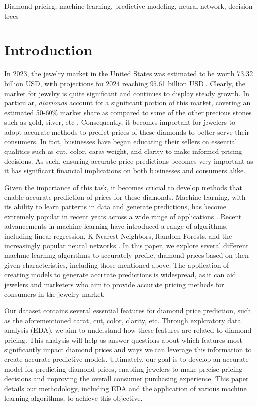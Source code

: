 \documentclass[conference]{IEEEtran}
\begin{document}
\begin{IEEEkeywords}
Diamond pricing, machine learning, predictive modeling, neural network, decision trees
\end{IEEEkeywords}

\section{Introduction}

In 2023, the jewelry market in the United States was estimated to be worth 73.32 billion USD, with projections for 2024 reaching 96.61 billion USD \cite{us}. Clearly, the market for jewelry is quite significant and continues to display steady growth. In particular, \emph{diamonds} account for a significant portion of this market, covering an estimated 50-60\% market share as compared to some of the other precious stones such as gold, silver, etc \cite{diamond}. Consequently, it becomes important for jewelers to adopt accurate methods to predict prices of these diamonds to better serve their consumers. In fact, businesses have began educating their sellers on essential qualities such as cut, color, carat weight, and clarity to make informed pricing decisions. As such, ensuring accurate price predictions becomes very important as it has significant financial implications on both businesses and consumers alike.

Given the importance of this task, it becomes crucial to develop methods that enable accurate prediction of prices for these diamonds. Machine learning, with its ability to learn patterns in data and generate predictions, has become extremely popular in recent years across a wide range of applications \cite{kino}. Recent advancements in machine learning have introduced a range of algorithms, including linear regression, K-Nearest Neighbors, Random Forests, and the increasingly popular neural networks \cite{sarker}. In this paper, we explore several different machine learning algorithms to accurately predict diamond prices based on their given characteristics, including those mentioned above. The application of creating models to generate accurate predictions is widespread, as it can aid jewelers and marketers who aim to provide accurate pricing methods for consumers in the jewelry market.

Our dataset contains several essential features for diamond price prediction, such as the aforementioned carat, cut, color, clarity, etc. \cite{kaggle} Through exploratory data analysis (EDA), we aim to understand how these features are related to diamond pricing. This analysis will help us answer questions about which features most significantly impact diamond prices and ways we can leverage this information to create accurate predictive models. Ultimately, our goal is to develop an accurate model for predicting diamond prices, enabling jewelers to make precise pricing decisions and improving the overall consumer purchasing experience. This paper details our methodology, including EDA and the application of various machine learning algorithms, to achieve this objective.
\end{document}
